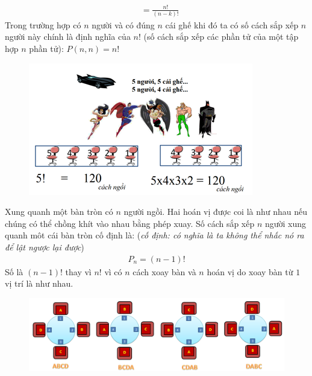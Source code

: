 \begin{multicols}{2}
\begin{align*}
		&= \frac{n!}{(n-k)!} 
	\end{align*}
	\vskip 0.1cm
	Trong trường hợp có $n$ người và có đúng $n$ cái ghế khi đó ta có số cách sắp xếp $n$ người này chính là định nghĩa của $n!$ (số cách sắp xếp các phần tử của một tập hợp $n$ phần tử): $P(n,n)=n!$
	\begin{figure}[H]
		\centering
		\vspace*{-10pt}
		\captionsetup{labelformat=empty, justification=centering}
		\includegraphics[width=1\linewidth]{_4}
		\vspace*{-15pt}
	\end{figure}
	\vskip 0.1cm
	 Xung quanh một bàn tròn có $n$ người ngồi. Hai hoán vị được coi là như nhau nếu chúng có thể chồng khít vào nhau bằng phép xuay. Số cách sắp xếp $n$ người xung quanh môt cái bàn tròn cố định là: (\textit{cố định: có nghĩa là ta không thể nhấc nó ra để lật ngược lại được})
	\begin{align*}
		P_n=(n-1)!
	\end{align*}
	Số là $(n-1)!$ thay vì $n!$ vì có $n$ cách xoay bàn và $n$ hoán vị do xoay bàn từ $1$ vị trí là như nhau.
	\begin{figure}[H]
		\centering
		\vspace*{-5pt}
		\captionsetup{labelformat=empty, justification=centering}
		\includegraphics[width=1\linewidth]{_5}

\end{figure}
\end{multicols}
